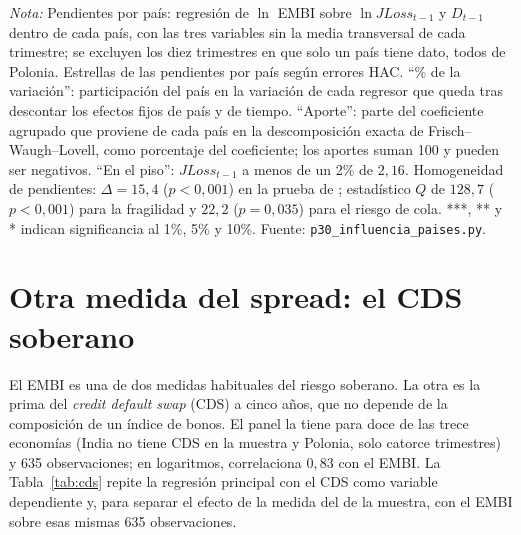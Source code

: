 \begin{table}[htbp]
\par\smallskip\parbox{0.95\linewidth}{\footnotesize \textit{Nota:} Pendientes por país: regresión de $\ln$ EMBI sobre $\ln JLoss_{t-1}$ y $D_{t-1}$ dentro de cada país, con las tres variables sin la media transversal de cada trimestre; se excluyen los diez trimestres en que solo un país tiene dato, todos de Polonia. Estrellas de las pendientes por país según errores HAC. ``\% de la variación'': participación del país en la variación de cada regresor que queda tras descontar los efectos fijos de país y de tiempo. ``Aporte'': parte del coeficiente agrupado que proviene de cada país en la descomposición exacta de Frisch--Waugh--Lovell, como porcentaje del coeficiente; los aportes suman 100 y pueden ser negativos. ``En el piso'': $JLoss_{t-1}$ a menos de un 2\% de $2{,}16$. Homogeneidad de pendientes: $\Delta=15{,}4$ ($p<0{,}001$) en la prueba de \citet{PesaranYamagata2008}; estadístico $Q$ de $128{,}7$ ($p<0{,}001$) para la fragilidad y $22{,}2$ ($p=0{,}035$) para el riesgo de cola. ***, ** y * indican significancia al 1\%, 5\% y 10\%. Fuente: \texttt{p30\_influencia\_paises.py}.}
\end{table}

\section{Otra medida del spread: el CDS soberano}
\label{sec:cds}

El EMBI es una de dos medidas habituales del riesgo soberano. La otra es la prima del \textit{credit default swap} (CDS) a cinco años, que no depende de la composición de un índice de bonos. El panel la tiene para doce de las trece economías (India no tiene CDS en la muestra y Polonia, solo catorce trimestres) y 635 observaciones; en logaritmos, correlaciona $0{,}83$ con el EMBI. La Tabla~\ref{tab:cds} repite la regresión principal con el CDS como variable dependiente y, para separar el efecto de la medida del de la muestra, con el EMBI sobre esas mismas 635 observaciones.

